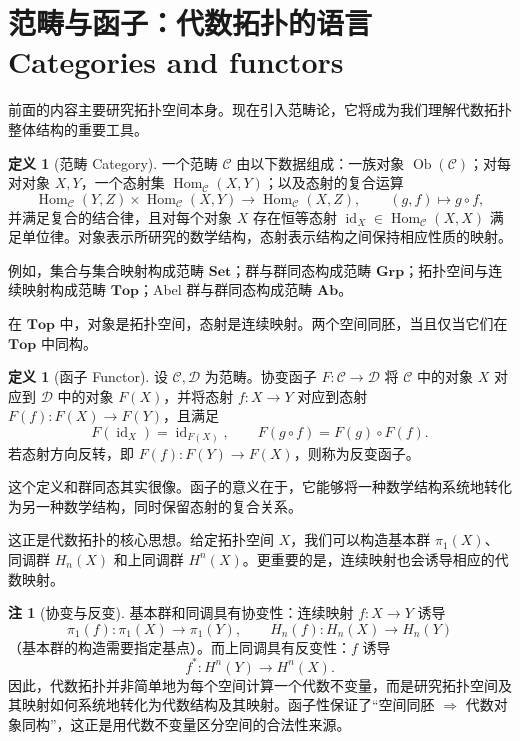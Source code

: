 \documentclass[12pt,a4paper,UTF8]{ctexart}
\theoremstyle{definition}
\newtheorem{definition}[theorem]{定义}
\newtheorem{remark}[theorem]{注}
\begin{document}
\section{范畴与函子：代数拓扑的语言\\
Categories and functors}

前面的内容主要研究拓扑空间本身。现在引入范畴论，它将成为我们理解代数拓扑整体结构的重要工具。

\begin{definition}[范畴 Category]
一个范畴 $\mathcal C$ 由以下数据组成：一族对象 $\operatorname{Ob}(\mathcal C)$；对每对对象 $X,Y$，一个态射集 $\operatorname{Hom}_{\mathcal C}(X,Y)$；以及态射的复合运算
\[
\operatorname{Hom}_{\mathcal C}(Y,Z)\times\operatorname{Hom}_{\mathcal C}(X,Y)\to\operatorname{Hom}_{\mathcal C}(X,Z),\qquad (g,f)\mapsto g\circ f,
\]
并满足复合的结合律，且对每个对象 $X$ 存在恒等态射 $\operatorname{id}_X\in\operatorname{Hom}_{\mathcal C}(X,X)$ 满足单位律。对象表示所研究的数学结构，态射表示结构之间保持相应性质的映射。
\end{definition}

例如，集合与集合映射构成范畴 $\mathbf{Set}$；群与群同态构成范畴 $\mathbf{Grp}$；拓扑空间与连续映射构成范畴 $\mathbf{Top}$；Abel 群与群同态构成范畴 $\mathbf{Ab}$。

在 $\mathbf{Top}$ 中，对象是拓扑空间，态射是连续映射。两个空间同胚，当且仅当它们在 $\mathbf{Top}$ 中同构。

\begin{definition}[函子 Functor]
设 $\mathcal C,\mathcal D$ 为范畴。协变函子 $F:\mathcal C\to\mathcal D$ 将 $\mathcal C$ 中的对象 $X$ 对应到 $\mathcal D$ 中的对象 $F(X)$，并将态射 $f:X\to Y$ 对应到态射 $F(f):F(X)\to F(Y)$，且满足
\[
F(\operatorname{id}_X)=\operatorname{id}_{F(X)},\qquad F(g\circ f)=F(g)\circ F(f).
\]
若态射方向反转，即 $F(f):F(Y)\to F(X)$，则称为反变函子。
\end{definition}

这个定义和群同态其实很像。函子的意义在于，它能够将一种数学结构系统地转化为另一种数学结构，同时保留态射的复合关系。

这正是代数拓扑的核心思想。给定拓扑空间 $X$，我们可以构造基本群 $\pi_1(X)$、同调群 $H_n(X)$ 和上同调群 $H^n(X)$。更重要的是，连续映射也会诱导相应的代数映射。

\begin{remark}[协变与反变]
基本群和同调具有协变性：连续映射 $f:X\to Y$ 诱导
\[
\pi_1(f):\pi_1(X)\to\pi_1(Y),\qquad H_n(f):H_n(X)\to H_n(Y)
\]
（基本群的构造需要指定基点）。而上同调具有反变性：$f$ 诱导
\[
f^*:H^n(Y)\to H^n(X).
\]
因此，代数拓扑并非简单地为每个空间计算一个代数不变量，而是研究拓扑空间及其映射如何系统地转化为代数结构及其映射。函子性保证了“空间同胚 $\Rightarrow$ 代数对象同构”，这正是用代数不变量区分空间的合法性来源。
\end{remark}
\end{document}

